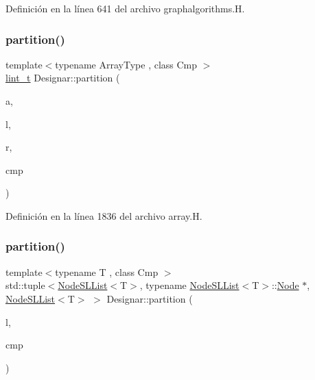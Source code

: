 Definición en la línea 641 del archivo graphalgorithms.\+H.

\mbox{\label{namespace_designar_a43b31dd9df26bd0c268d2aa653de6cf0}} 
\subsubsection{\texorpdfstring{partition()}{partition()}\hspace{0.1cm}{\footnotesize\ttfamily [1/3]}}
{\footnotesize\ttfamily template$<$typename Array\+Type , class Cmp $>$ \\
\hyperlink{namespace_designar_a9d113d66a39e82b73727c72cd3a52f73}{lint\+\_\+t} Designar\+::partition (\begin{DoxyParamCaption}\item[{Array\+Type \&}]{a,  }\item[{\hyperlink{namespace_designar_a9d113d66a39e82b73727c72cd3a52f73}{lint\+\_\+t}}]{l,  }\item[{\hyperlink{namespace_designar_a9d113d66a39e82b73727c72cd3a52f73}{lint\+\_\+t}}]{r,  }\item[{Cmp \&}]{cmp }\end{DoxyParamCaption})}



Definición en la línea 1836 del archivo array.\+H.

\mbox{\label{namespace_designar_acbe78eef938395624f248f069fcc3de0}} 
\subsubsection{\texorpdfstring{partition()}{partition()}\hspace{0.1cm}{\footnotesize\ttfamily [2/3]}}
{\footnotesize\ttfamily template$<$typename T , class Cmp $>$ \\
std\+::tuple$<$\hyperlink{class_designar_1_1_node_s_l_list}{Node\+S\+L\+List}$<$T$>$, typename \hyperlink{class_designar_1_1_node_s_l_list}{Node\+S\+L\+List}$<$T$>$\+::\hyperlink{namespace_designar_a5af326c65aa2bd26b26c410f2030d09e}{Node} $\ast$, \hyperlink{class_designar_1_1_node_s_l_list}{Node\+S\+L\+List}$<$T$>$ $>$ Designar\+::partition (\begin{DoxyParamCaption}\item[{\hyperlink{class_designar_1_1_node_s_l_list}{Node\+S\+L\+List}$<$ T $>$ \&}]{l,  }\item[{Cmp \&}]{cmp }\end{DoxyParamCaption})\hspace{0.3cm}{\ttfamily [inline]}}



